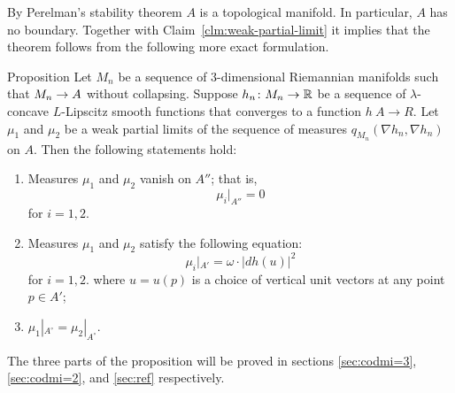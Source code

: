 By Perelman's stability theorem $A$ is a topological manifold.
In particular, $A$ has no boundary.
Together with Claim~\ref{clm:weak-partial-limit} it implies that the theorem follows from the following more exact formulation.

\begin{thm}{Proposition}\label{prop:3parts}
Let $M_n$ be a sequence of $3$-dimensional Riemannian manifolds such that $M_n\zz\to A$ without collapsing.
Suppose $h_n\colon M_n\to\mathbb{R}$ be a sequence of $\lambda$-concave $L$-Lipscitz smooth functions that converges to a function $h\:A\to R$.
Let $\mu_1$ and $\mu_2$ be a weak partial limits of the sequence of measures $q_{M_n}(\nabla h_n,\nabla h_n)$ on $A$.
Then the following statements hold:
\begin{enumerate}
\item\label{prop:3parts:codim3} Measures $\mu_1$ and $\mu_2$ vanish on $A''$; that is, 
\[\mu_i|_{A''}=0\]
for $i=1,2$.

\item\label{prop:3parts:codim2} Measures $\mu_1$ and $\mu_2$ satisfy the following equation:
\[\mu_i|_{A'}=\omega\cdot |dh(u)|^2\]
for $i=1,2$.
where $u=u(p)$ is a choice of vertical unit vectors at any point $p\in A'$;

\item\label{prop:3parts:reg} $\mu_1|_{A^\circ}=\mu_2|_{A^\circ}$.
\end{enumerate}
\end{thm}

The three parts of the proposition will be proved in sections \ref{sec:codmi=3}, \ref{sec:codmi=2}, and \ref{sec:ref} respectively.
